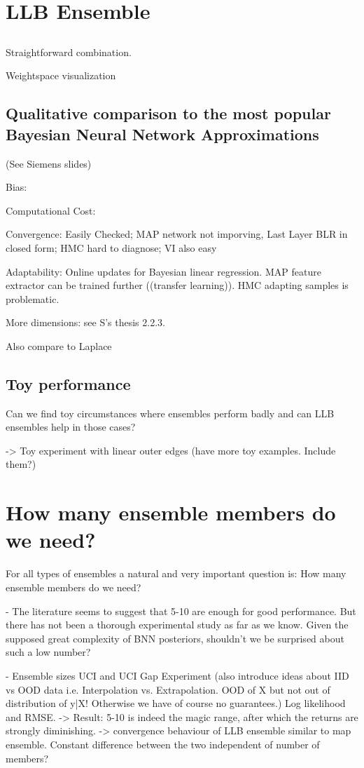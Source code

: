 \documentclass[12pt, A4, twoside]{report}
\begin{document}
\chapter{LLB Ensemble}
\section{}
Straightforward combination.

Weightspace visualization


\section{Qualitative comparison to the most popular Bayesian Neural Network Approximations}
(See Siemens slides)

Bias:

Computational Cost: 

Convergence:  Easily Checked; MAP network not imporving, Last Layer BLR in closed form; HMC hard to diagnose; VI also easy

Adaptability: Online updates for Bayesian linear regression. MAP feature extractor can be trained further ((transfer learning)). HMC adapting samples is problematic.

More dimensions: see S's thesis 2.2.3.

Also compare to Laplace


\section{Toy performance}
Can we find toy circumstances where ensembles perform badly and can LLB ensembles help in those cases?

-> Toy experiment with linear outer edges (have more toy examples. Include them?)


\chapter{How many ensemble members do we need?}

For all types of ensembles a natural and very important question is: How many ensemble members do we need?

- The literature seems to suggest that 5-10 are enough for good performance. But there has not been a thorough experimental study as far as we know.
Given the supposed great complexity of BNN posteriors, shouldn't we be surprised about such a low number?

- Ensemble sizes UCI and UCI Gap Experiment (also introduce ideas about IID vs OOD data i.e. Interpolation vs. Extrapolation. OOD of X but not out of distribution of y|X! Otherwise we have of course no guarantees.) Log likelihood and RMSE.
-> Result: 5-10 is indeed the magic range, after which the returns are strongly diminishing.
-> convergence behaviour of LLB ensemble similar to map ensemble. Constant difference between the two independent of number of members?
\end{document}
